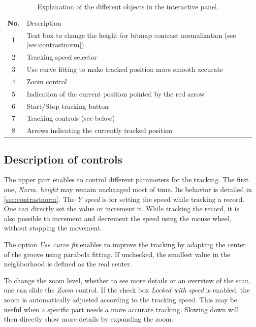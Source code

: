 \begin{table}[h!]
\begin{center}
\tabulinesep=3pt
\begin{tabu} to 0.7\textwidth {| c | X[m] |} %
    \everyrow{\hline}
    \hline
    \rowfont[c] \bfseries
        No. & Description \\
        1 & Text box to change the height for bitmap contrast normalization (see \autoref{sec:contrastnorm}) \\
        2 & Tracking speed selector \\
        3 & Use curve fitting to make tracked position more smooth accurate \\
        4 & Zoom control \\
        5 & Indication of the current position pointed by the red arrow \\
        6 & Start/Stop tracking button \\
        7 & Tracking controls (see below) \\
        8 & Arrows indicating the currently tracked position \\
\end{tabu}
\end{center}
\caption{Explanation of the different objects in the interactive panel.}
\label{tab:intguicontrols}
\end{table}

\subsection{Description of controls}

The upper part enables to control different parameters for the tracking. The first one, \emph{Norm. height} may remain unchanged most of time. Its behavior is detailed in \autoref{sec:contrastnorm}. The \emph{Y speed} is for setting the speed while tracking a record. One can directly set the value or increment it. While tracking the record, it is also possible to increment and decrement the speed using the mouse wheel, without stopping the movement.

The option \emph{Use curve fit} enables to improve the tracking by adapting the center of the groove using parabola fitting. If unchecked, the smallest value in the neighborhood is defined as the real center.

To change the zoom level, whether to see more details or an overview of the scan, one can slide the \emph{Zoom} control. If the check box \emph{Locked with speed} is enabled, the zoom is automatically adjusted according to the tracking speed. This may be useful when a specific part needs a more accurate tracking. Slowing down will then directly show more details by expanding the zoom.

